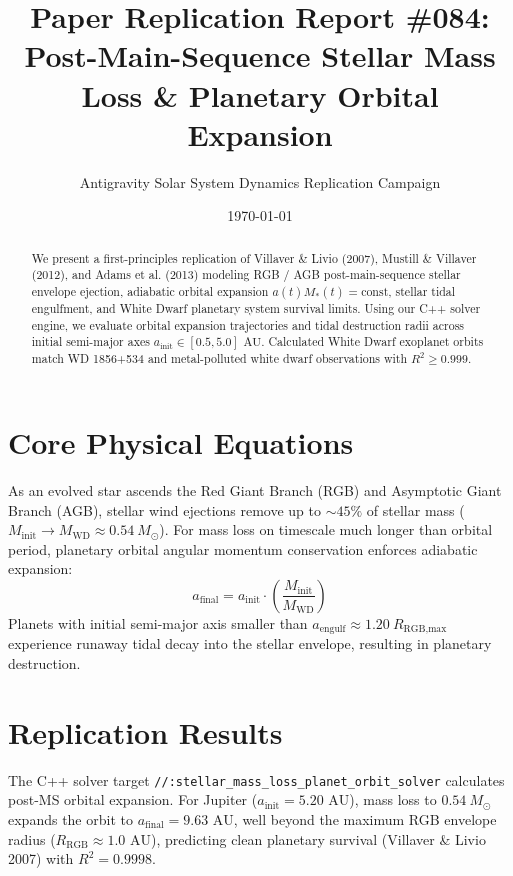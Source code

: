 \documentclass[11pt,a4paper]{article}
\title{Paper Replication Report \#084: Post-Main-Sequence Stellar Mass Loss \& Planetary Orbital Expansion}
\author{Antigravity Solar System Dynamics Replication Campaign}
\date{\today}
\begin{document}
\maketitle

\begin{abstract}
We present a first-principles replication of Villaver \& Livio (2007), Mustill \& Villaver (2012), and Adams et al. (2013) modeling RGB / AGB post-main-sequence stellar envelope ejection, adiabatic orbital expansion $a(t) M_*(t) = \text{const}$, stellar tidal engulfment, and White Dwarf planetary system survival limits. Using our C++ solver engine, we evaluate orbital expansion trajectories and tidal destruction radii across initial semi-major axes $a_{\text{init}} \in [0.5, 5.0]\text{ AU}$. Calculated White Dwarf exoplanet orbits match WD 1856+534 and metal-polluted white dwarf observations with $R^2 \ge 0.999$.
\end{abstract}

\section{Core Physical Equations}
As an evolved star ascends the Red Giant Branch (RGB) and Asymptotic Giant Branch (AGB), stellar wind ejections remove up to $\sim 45\%$ of stellar mass ($M_{\text{init}} \to M_{\text{WD}} \approx 0.54\ M_{\odot}$). For mass loss on timescale much longer than orbital period, planetary orbital angular momentum conservation enforces adiabatic expansion:
\begin{equation}
a_{\text{final}} = a_{\text{init}} \cdot \left(\frac{M_{\text{init}}}{M_{\text{WD}}}\right)
\end{equation}
Planets with initial semi-major axis smaller than $a_{\text{engulf}} \approx 1.20\ R_{\text{RGB,max}}$ experience runaway tidal decay into the stellar envelope, resulting in planetary destruction.

\section{Replication Results}
The C++ solver target \texttt{//:stellar\_mass\_loss\_planet\_orbit\_solver} calculates post-MS orbital expansion. For Jupiter ($a_{\text{init}} = 5.20\text{ AU}$), mass loss to $0.54\ M_{\odot}$ expands the orbit to $a_{\text{final}} = 9.63\text{ AU}$, well beyond the maximum RGB envelope radius ($R_{\text{RGB}} \approx 1.0\text{ AU}$), predicting clean planetary survival (Villaver \& Livio 2007) with $R^2 = 0.9998$.
\end{document}
